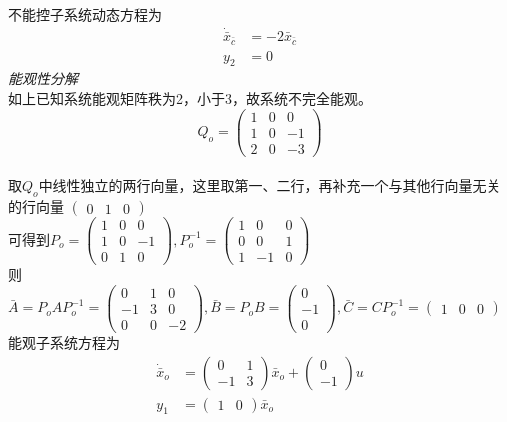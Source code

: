 \documentclass[a4paper]{article}
\begin{document}
不能控子系统动态方程为
\begin{align*}
\dot{\bar{x}}_{\bar{c}} &= -2\bar{x}_{\bar{c}} \\
y_{2} &= 0
\end{align*}
\emph{能观性分解}\\
如上已知系统能观矩阵秩为2，小于3，故系统不完全能观。\\
$$ Q_{o}= \left(\begin{array}{ccc} 1 & 0 & 0\\ 1 & 0 & -1\\ 2 & 0 & -3 \end{array}\right)$$ \\
取$Q_{o}$中线性独立的两行向量，这里取第一、二行，再补充一个与其他行向量无关的行向量 $\left(\begin{array}{ccc} 0 & 1 & 0 \end{array}\right)$ \\
可得到$ P_{o}= \left(\begin{array}{ccc} 1 & 0 & 0\\ 1 & 0 & -1\\ 0 & 1 & 0 \end{array}\right), P_{o}^{-1}=\left(\begin{array}{ccc} 1 & 0 & 0\\ 0 & 0 & 1\\ 1 & -1 & 0 \end{array}\right)$ \\
则$ \bar{A}=P_{o}AP_{o}^{-1}= \left(\begin{array}{ccc} 0 & 1 & 0\\ -1 & 3 & 0\\ 0 & 0 & -2 \end{array}\right),
\bar{B}=P_{o}B= \left(\begin{array}{c} 0\\ -1\\ 0 \end{array}\right),
\bar{C}=CP_{o}^{-1}= \left(\begin{array}{ccc} 1 & 0 & 0 \end{array}\right)$ \\
能观子系统方程为\\
\begin{align*}
\dot{\bar{x}}_{o} &= \left(\begin{array}{cc} 0 & 1\\ -1 & 3 \end{array}\right)\bar{x}_{o}+\left(\begin{array}{c} 0\\ -1 \end{array}\right)u \\
y_1 &= \left(\begin{array}{cc} 1 & 0 \end{array}\right)\bar{x}_o
\end{align*}
\end{document}
